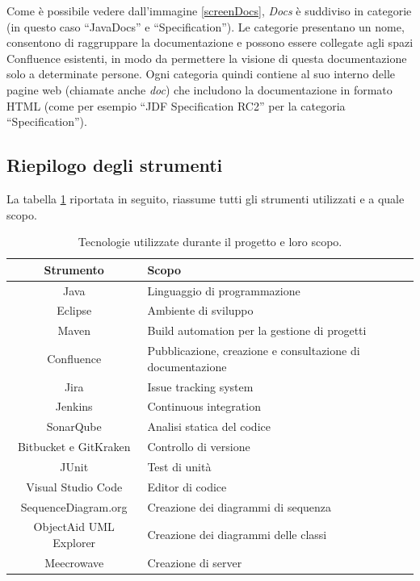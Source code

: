     Come è possibile vedere dall'immagine \ref{screenDocs}, \emph{Docs} è suddiviso in categorie (in questo caso ``JavaDocs'' e ``Specification'').
    Le categorie presentano un nome, consentono di raggruppare la documentazione e possono essere collegate agli spazi Confluence esistenti, in modo da permettere la visione di questa documentazione solo a determinate persone.
    Ogni categoria quindi contiene al suo interno delle pagine web (chiamate anche \emph{doc}) che includono la documentazione in formato HTML \cite{site:docs-plugin} (come per esempio ``JDF Specification RC2'' per la categoria ``Specification'').


    \subsection{Riepilogo degli strumenti}

    La tabella \ref{tabellaStrumenti} riportata in seguito, riassume tutti gli strumenti utilizzati e a quale scopo.

        \begin{table}[H]
            {\def\arraystretch{1.5}
            \begin{tabularx}{\textwidth}{cX}
                \rowcolor{beautyblue}
                \textbf{Strumento} &
                \textbf{Scopo} \\ \hline
                Java & Linguaggio di programmazione \\
                Eclipse & Ambiente di sviluppo \\
                Maven & Build automation per la gestione di progetti \\
                Confluence & Pubblicazione, creazione e consultazione di documentazione \\
                Jira & Issue tracking system \\
                Jenkins & Continuous integration \\
                SonarQube & Analisi statica del codice \\
                Bitbucket e GitKraken & Controllo di versione \\
                JUnit & Test di unità \\
                Visual Studio Code & Editor di codice \\
                SequenceDiagram.org & Creazione dei diagrammi di sequenza \\
                ObjectAid UML Explorer & Creazione dei diagrammi delle classi \\
                Meecrowave & Creazione di server \\
            \end{tabularx}} \\
        \caption{Tecnologie utilizzate durante il progetto e loro scopo.}
        \label{tabellaStrumenti}
        \end{table}


